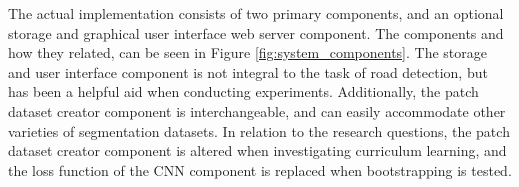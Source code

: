 The actual implementation consists of two primary components, and an optional storage and graphical user interface web server component. The components and how they related, can be seen in Figure \ref{fig:system_components}. The storage and user interface component is not integral to the task of road detection, but has been a helpful aid when conducting experiments. Additionally, the patch dataset creator component is interchangeable, and can easily accommodate other varieties of segmentation datasets. In relation to the research questions, the patch dataset creator component is altered when investigating curriculum learning, and the loss function of the \ac{CNN} component is replaced when bootstrapping is tested. \\



